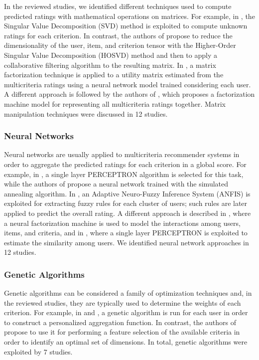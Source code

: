 In the reviewed studies, we identified different techniques used to compute predicted ratings with mathematical operations on matrices. For example, in , the Singular Value Decomposition (SVD) method is exploited to compute unknown ratings for each criterion. In contrast, the authors of  propose to reduce the dimensionality of the user, item, and criterion tensor with the Higher-Order Singular Value Decomposition (HOSVD) method and then to apply a collaborative filtering algorithm to the resulting matrix. In , a matrix factorization technique is applied to a utility matrix estimated from the multicriteria ratings using a neural network model trained considering each user. A different approach is followed by the authors of , which proposes a factorization machine model for representing all multicriteria ratings together. Matrix manipulation techniques were discussed in 12 studies.

\subsubsection{Neural Networks}

Neural networks are usually applied to multicriteria recommender systems in order to aggregate the predicted ratings for each criterion in a global score. For example, in , a single layer PERCEPTRON algorithm is selected for this task, while the authors of  propose a neural network trained with the simulated annealing algorithm. In , an Adaptive Neuro-Fuzzy Inference System (ANFIS) is exploited for extracting fuzzy rules for each cluster of users; such rules are later applied to predict the overall rating. A different approach is described in , where a neural factorization machine is used to model the interactions among users, items, and criteria, and in , where a single layer PERCEPTRON is exploited to estimate the similarity among users. We identified neural network approaches in 12 studies.

\subsubsection{Genetic Algorithms}

Genetic algorithms can be considered a family of optimization techniques and, in the reviewed studies, they are typically used to determine the weights of each criterion. For example, in  and , a genetic algorithm is run for each user in order to construct a personalized aggregation function. In contrast, the authors of  propose to use it for performing a feature selection of the available criteria in order to identify an optimal set of dimensions. In total, genetic algorithms were exploited by 7 studies.

